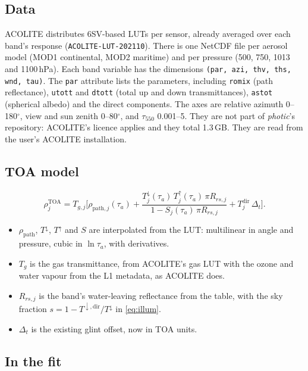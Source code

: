 \documentclass[11pt]{article}
\numberwithin{equation}{section}
\newcommand{\rTOA}{\rho^{\mathrm{TOA}}}
\newcommand{\code}[1]{\texttt{#1}}
\begin{document}
\subsection{Data}

ACOLITE distributes 6SV-based LUTs per sensor, already averaged over each band's response
(\code{ACOLITE-LUT-202110}). There is one NetCDF file per aerosol model (MOD1 continental,
MOD2 maritime) and per pressure (500, 750, 1013 and 1100\,hPa). Each band variable has the
dimensions \code{(par, azi, thv, ths, wnd, tau)}. The \code{par} attribute lists the
parameters, including \code{romix} (path reflectance), \code{utott} and \code{dtott} (total
up and down transmittances), \code{astot} (spherical albedo) and the direct components. The
axes are relative azimuth 0--180$^\circ$, view and sun zenith 0--80$^\circ$, and
$\tau_{550}$ 0.001--5. They are not part of \textit{photic}'s repository: ACOLITE's licence
applies and they total 1.3\,GB. They are read from the user's ACOLITE installation.

\subsection{TOA model}

\begin{equation}\label{eq:toa}
\rTOA_j = T_{g,j}\Big[\rho_{\mathrm{path},j}(\tau_a)
  + \frac{T^{\downarrow}_j(\tau_a)\,T^{\uparrow}_j(\tau_a)\,\pi R_{rs,j}}{1 - S_j(\tau_a)\,\pi R_{rs,j}}
  + T^{\mathrm{dir}}_j\,\Delta_t\Big].
\end{equation}
\begin{itemize}
\item $\rho_{\mathrm{path}}$, $T^\downarrow$, $T^\uparrow$ and $S$ are interpolated from the
LUT: multilinear in angle and pressure, cubic in $\ln\tau_a$, with derivatives.
\item $T_g$ is the gas transmittance, from ACOLITE's gas LUT with the ozone and water vapour
from the L1 metadata, as ACOLITE does.
\item $R_{rs,j}$ is the band's water-leaving reflectance from the table, with the sky fraction
$s = 1 - T^{\downarrow,\mathrm{dir}}/T^{\downarrow}$ in \eqref{eq:illum}.
\item $\Delta_t$ is the existing glint offset, now in TOA units.
\end{itemize}

\subsection{In the fit}
\end{document}
